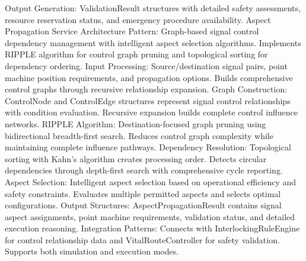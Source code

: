 Output Generation: ValidationResult structures with detailed safety assessments, resource reservation status, and emergency procedure availability.
Aspect Propagation Service
Architecture Pattern: Graph-based signal control dependency management with intelligent aspect selection algorithms. Implements RIPPLE algorithm for control graph pruning and topological sorting for dependency ordering.
Input Processing: Source/destination signal pairs, point machine position requirements, and propagation options. Builds comprehensive control graphs through recursive relationship expansion.
Graph Construction: ControlNode and ControlEdge structures represent signal control relationships with condition evaluation. Recursive expansion builds complete control influence networks.
RIPPLE Algorithm: Destination-focused graph pruning using bidirectional breadth-first search. Reduces control graph complexity while maintaining complete influence pathways.
Dependency Resolution: Topological sorting with Kahn's algorithm creates processing order. Detects circular dependencies through depth-first search with comprehensive cycle reporting.
Aspect Selection: Intelligent aspect selection based on operational efficiency and safety constraints. Evaluates multiple permitted aspects and selects optimal configurations.
Output Structures: AspectPropagationResult contains signal aspect assignments, point machine requirements, validation status, and detailed execution reasoning.
Integration Patterns: Connects with InterlockingRuleEngine for control relationship data and VitalRouteController for safety validation. Supports both simulation and execution modes.
